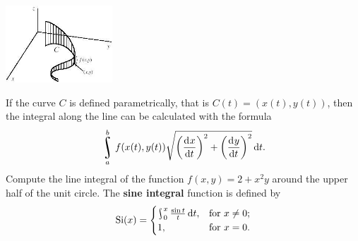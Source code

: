 \begin{questions}
            \begin{center}
              \includegraphics[width=0.3\textwidth]{contourintegral}
            \end{center}
            If the curve $ C $ is defined parametrically, that is $ C(t) = (x(t), y(t)) $, then the integral along the line can be
            calculated with the formula
            \begin{displaymath}
              \rint_a^b f(x(t), y(t)) \sqrt{\left(\dod{x}{t}\right)^2 + \left(\dod{y}{t}\right)^2} \dif{t}.
            \end{displaymath}
            Compute the line integral of the function $ f(x,y) = 2 + x^2 y $ around the upper half of the unit circle.
  \questioS The \textbf{sine integral} function is defined by
            \begin{displaymath}
              \mathrm{Si}(x) =
              \begin{cases}
                \rint^x_0 \frac{\sin t}{t} \dif{t}, &\text{for $ x \neq 0 $;}\\
                1, &\text{for $ x = 0 $.}
              \end{cases}
            \end{displaymath}
\end{questions}
